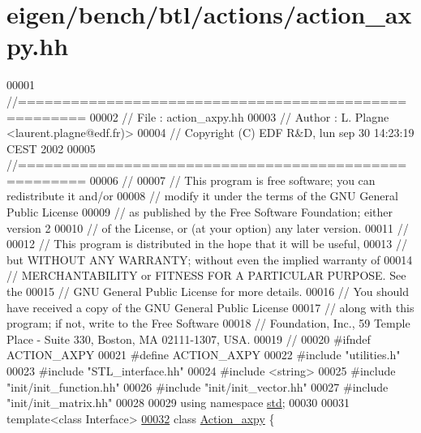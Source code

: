 \hypertarget{eigen_2bench_2btl_2actions_2action__axpy_8hh_source}{}\section{eigen/bench/btl/actions/action\+\_\+axpy.hh}
\label{eigen_2bench_2btl_2actions_2action__axpy_8hh_source}

\begin{DoxyCode}
00001 \textcolor{comment}{//=====================================================}
00002 \textcolor{comment}{// File   :  action\_axpy.hh}
00003 \textcolor{comment}{// Author :  L. Plagne <laurent.plagne@edf.fr)>}
00004 \textcolor{comment}{// Copyright (C) EDF R&D,  lun sep 30 14:23:19 CEST 2002}
00005 \textcolor{comment}{//=====================================================}
00006 \textcolor{comment}{//}
00007 \textcolor{comment}{// This program is free software; you can redistribute it and/or}
00008 \textcolor{comment}{// modify it under the terms of the GNU General Public License}
00009 \textcolor{comment}{// as published by the Free Software Foundation; either version 2}
00010 \textcolor{comment}{// of the License, or (at your option) any later version.}
00011 \textcolor{comment}{//}
00012 \textcolor{comment}{// This program is distributed in the hope that it will be useful,}
00013 \textcolor{comment}{// but WITHOUT ANY WARRANTY; without even the implied warranty of}
00014 \textcolor{comment}{// MERCHANTABILITY or FITNESS FOR A PARTICULAR PURPOSE.  See the}
00015 \textcolor{comment}{// GNU General Public License for more details.}
00016 \textcolor{comment}{// You should have received a copy of the GNU General Public License}
00017 \textcolor{comment}{// along with this program; if not, write to the Free Software}
00018 \textcolor{comment}{// Foundation, Inc., 59 Temple Place - Suite 330, Boston, MA  02111-1307, USA.}
00019 \textcolor{comment}{//}
00020 \textcolor{preprocessor}{#ifndef ACTION\_AXPY}
00021 \textcolor{preprocessor}{#define ACTION\_AXPY}
00022 \textcolor{preprocessor}{#include "utilities.h"}
00023 \textcolor{preprocessor}{#include "STL\_interface.hh"}
00024 \textcolor{preprocessor}{#include <string>}
00025 \textcolor{preprocessor}{#include "init/init\_function.hh"}
00026 \textcolor{preprocessor}{#include "init/init\_vector.hh"}
00027 \textcolor{preprocessor}{#include "init/init\_matrix.hh"}
00028 
00029 \textcolor{keyword}{using namespace }\hyperlink{namespacestd}{std};
00030 
00031 \textcolor{keyword}{template}<\textcolor{keyword}{class} Interface>
\hyperlink{class_action__axpy}{00032} \textcolor{keyword}{class }\hyperlink{class_action__axpy}{Action\_axpy} \{

\end{DoxyCode}
